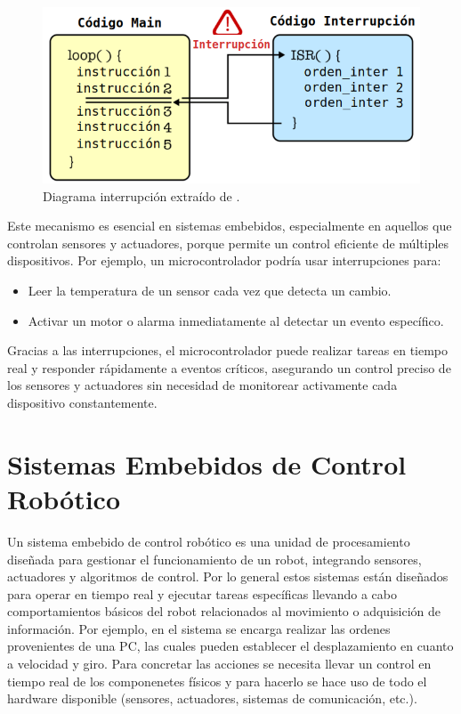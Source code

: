 \begin{figure}[H]
	\centering
    \includegraphics[width=0.7\linewidth]{components_interrupt.png}
    \caption{Diagrama interrupción extraído de \cite{imgInterrupciones}.}
    \label{interrupt}
\end{figure}

Este mecanismo es esencial en sistemas embebidos, especialmente en aquellos que controlan sensores y actuadores, porque permite un control eficiente de múltiples dispositivos. Por ejemplo, un microcontrolador podría usar interrupciones para:

\begin{itemize}
    \item Leer la temperatura de un sensor cada vez que detecta un cambio.
    \item Activar un motor o alarma inmediatamente al detectar un evento específico.
\end{itemize}

Gracias a las interrupciones, el microcontrolador puede realizar tareas en tiempo real y responder rápidamente a eventos críticos, asegurando un control preciso de los sensores y actuadores sin necesidad de monitorear activamente cada dispositivo constantemente.


\section{Sistemas Embebidos de Control Robótico}
\label{sistControl}

Un sistema embebido de control robótico es una unidad de procesamiento diseñada para gestionar el funcionamiento de un robot, integrando sensores, actuadores y algoritmos de control. Por lo general estos sistemas están diseñados para operar en tiempo real y ejecutar tareas específicas llevando a cabo comportamientos básicos del robot relacionados al movimiento o adquisición de información. Por ejemplo, en \cite{paperPomponio} el sistema se encarga realizar las ordenes provenientes de una PC, las cuales pueden establecer el desplazamiento en cuanto a velocidad y giro. Para concretar las acciones se necesita llevar un control en tiempo real de los componenetes físicos y para hacerlo se hace uso de todo el hardware disponible (sensores, actuadores, sistemas de comunicación, etc.).

